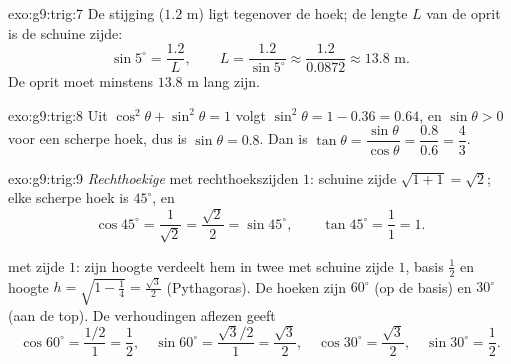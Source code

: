 \begin{solution}{exo:g9:trig:7}
De stijging ($1.2$ m) ligt tegenover de hoek; de lengte $L$ van de oprit is de
schuine zijde:
\[
\sin 5^\circ = \frac{1.2}{L},
\qquad
L = \frac{1.2}{\sin 5^\circ} \approx \frac{1.2}{0.0872} \approx 13.8
\text{ m}.
\]
De oprit moet minstens $13.8$ m lang zijn.
\end{solution}

\begin{solution}{exo:g9:trig:8}
Uit $\cos^2\theta + \sin^2\theta = 1$ volgt $\sin^2\theta = 1 - 0.36 = 0.64$, en
$\sin\theta > 0$ voor een scherpe hoek, dus is $\sin\theta = 0.8$. Dan is
$\tan\theta = \dfrac{\sin\theta}{\cos\theta} = \dfrac{0.8}{0.6} = \dfrac43$.
\end{solution}

\begin{solution}{exo:g9:trig:9}
\emph{Rechthoekige } met rechthoekszijden $1$: schuine zijde
$\sqrt{1 + 1} = \sqrt2$; elke scherpe hoek is $45^\circ$, en
\[
\cos 45^\circ = \frac{1}{\sqrt2} = \frac{\sqrt2}{2} = \sin 45^\circ,
\qquad
\tan 45^\circ = \frac11 = 1 .
\]

\emph{} met zijde $1$: zijn hoogte verdeelt hem in twee
 met schuine zijde $1$, basis $\frac12$ en hoogte
$h = \sqrt{1 - \frac14} = \frac{\sqrt3}{2}$ (Pythagoras). De hoeken zijn
$60^\circ$ (op de basis) en $30^\circ$ (aan de top). De verhoudingen aflezen geeft
\[
\cos 60^\circ = \frac{1/2}{1} = \frac12, \quad
\sin 60^\circ = \frac{\sqrt3/2}{1} = \frac{\sqrt3}{2}, \quad
\cos 30^\circ = \frac{\sqrt3}{2}, \quad
\sin 30^\circ = \frac12 .
\]
\end{solution}


